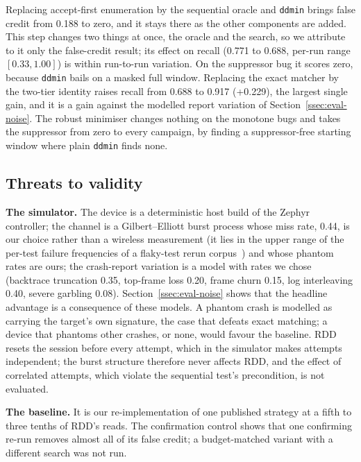 Replacing accept-first enumeration by the sequential oracle and \texttt{ddmin}
brings false credit from 0.188 to zero, and it stays there as the other
components are added. %
This step changes two things at once, the oracle and the search, so we attribute
to it only the false-credit result; its effect on recall (0.771 to 0.688, per-run
range $[0.33, 1.00]$) is within run-to-run variation. On the suppressor bug it
scores zero, because \texttt{ddmin} bails on a masked full window. Replacing the
exact matcher by the two-tier identity raises recall from 0.688 to 0.917
(+0.229), the largest single gain, and it is a gain against the modelled report
variation of Section~\ref{ssec:eval-noise}. The robust minimiser changes nothing
on the monotone bugs and takes the suppressor from zero to every campaign, by
finding a suppressor-free starting window where plain \texttt{ddmin} finds none.

\subsection{Threats to validity}

\textbf{The simulator.} The device is a deterministic host build of the Zephyr
controller; the channel is a Gilbert--Elliott burst process whose miss rate,
0.44, is our choice rather than a wireless measurement (it lies in the upper
range of the per-test failure frequencies of a flaky-test rerun
corpus~\cite{flakeflagger2021}) and whose phantom rates are ours; the
crash-report variation is a model with rates we chose (backtrace
truncation 0.35, top-frame loss 0.20, frame churn 0.15, log interleaving 0.40,
severe garbling 0.08). Section~\ref{ssec:eval-noise} shows that the headline
advantage is a consequence of these models. A phantom crash is modelled as
carrying the target's own signature, the case that defeats exact matching; a
device that phantoms other crashes, or none, would favour the baseline. RDD
resets the session before every attempt, which in the simulator makes attempts
independent; the burst structure therefore never affects RDD, and the effect of
correlated attempts, which violate the sequential test's precondition, is not
evaluated.

\textbf{The baseline.} It is our re-implementation of one published strategy at
a fifth to three tenths of RDD's reads. The confirmation control shows that one confirming
re-run removes almost all of its false credit; a budget-matched variant with a
different search was not run.

